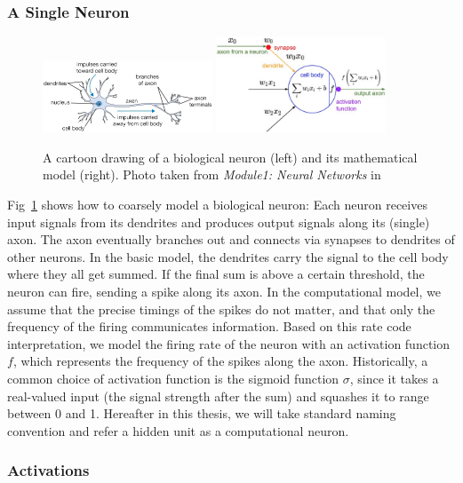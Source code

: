 \subsubsection{A Single Neuron}
\begin{figure}[t]
    \centering
    \includegraphics[width=0.45\textwidth]{figure/ch3-bioneuron.png}
    \includegraphics[width=0.45\textwidth]{figure/ch3-compneuron.png}
    \caption{A  cartoon drawing of a biological neuron (left) and its mathematical model (right). Photo taken from \emph{Module1: Neural Networks} in~\cite{links:cs231n}}
    \label{fig:ch3-neuron}
\end{figure}


Fig~\ref{fig:ch3-neuron} shows how to coarsely model a biological neuron: Each neuron receives input signals from its dendrites and produces output signals along its (single) axon. The axon eventually branches out and connects via synapses to dendrites of other neurons. In the basic model, the dendrites carry the signal to the cell body where they all get summed. If the final sum is above a certain threshold, the neuron can fire, sending a spike along its axon. In the computational model, we assume that the precise timings of the spikes do not matter, and that only the frequency of the firing communicates information. Based on this rate code interpretation, we model the firing rate of the neuron with an activation function $f$, which represents the frequency of the spikes along the axon. Historically, a common choice of activation function is the sigmoid function $\sigma$, since it takes a real-valued input (the signal strength after the sum) and squashes it to range between 0 and 1. Hereafter in this thesis, we will take standard naming convention and refer a hidden unit as a computational neuron.

\subsubsection{Activations}

